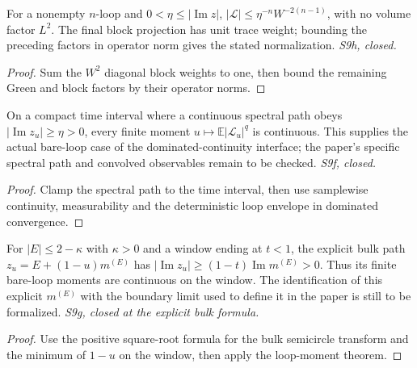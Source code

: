 \begin{lemma}
  \label{lem:loop-envelope-sharp}
  \leanok
  For a nonempty $n$-loop and $0<\eta\le|\operatorname{Im}z|$,
  $|\mathcal L|\le\eta^{-n}W^{-2(n-1)}$, with no volume factor $L^2$.
  The final block projection has unit trace weight; bounding the preceding
  factors in operator norm gives the stated normalization.
  \emph{S9h, closed.}
\end{lemma}
\begin{proof}\leanok
  Sum the $W^2$ diagonal block weights to one, then bound the remaining
  Green and block factors by their operator norms.
\end{proof}

\begin{lemma}
  \label{lem:loop-moment-cont}
  \leanok
  On a compact time interval where a continuous spectral path obeys
  $|\operatorname{Im}z_u|\ge\eta>0$, every finite moment
  $u\mapsto\mathbb E|\mathcal L_u|^q$ is continuous. This supplies the
  actual bare-loop case of the dominated-continuity interface; the paper's
  specific spectral path and convolved observables remain to be checked.
  \emph{S9f, closed.}
\end{lemma}
\begin{proof}\leanok
  Clamp the spectral path to the time interval, then use samplewise continuity,
  measurability and the deterministic loop envelope in dominated convergence.
\end{proof}

\begin{lemma}
  \label{lem:spectral-window}
  \leanok
  For $|E|\le2-\kappa$ with $\kappa>0$ and a window ending at $t<1$,
  the explicit bulk path $z_u=E+(1-u)m^{(E)}$ has
  $|\operatorname{Im}z_u|\ge(1-t)\operatorname{Im}m^{(E)}>0$.
  Thus its finite bare-loop moments are continuous on the window.
  The identification of this explicit $m^{(E)}$ with the boundary limit
  used to define it in the paper is still to be formalized.
  \emph{S9g, closed at the explicit bulk formula.}
\end{lemma}
\begin{proof}\leanok
  Use the positive square-root formula for the bulk semicircle transform and
  the minimum of $1-u$ on the window, then apply the loop-moment theorem.
\end{proof}

